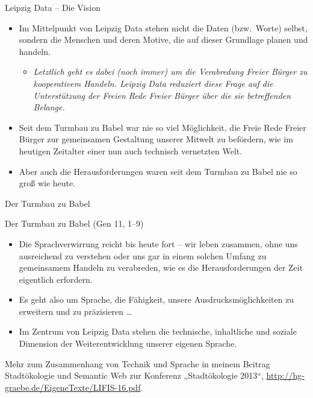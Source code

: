 \documentclass{beamer}
\begin{document}
\begin{frame}{Leipzig Data – Die Vision}{}
  \begin{itemize}
  \item Im Mittelpunkt von Leipzig Data stehen nicht die Daten (bzw.\ Worte)
    selbst, sondern die Menschen und deren Motive, die auf dieser Grundlage
    {planen} und {handeln}.
    \begin{itemize}
    \item[] \small\it Letztlich geht es dabei (noch immer) um die Verabredung
      Freier Bürger zu kooperativem Handeln. Leipzig Data reduziert diese Frage
      auf die {Unterstützung der Freien Rede Freier Bürger über die sie
        betreffenden Belange}.
    \end{itemize}
  \item Seit dem Turmbau zu Babel war nie so viel Möglichkeit, die Freie Rede
    Freier Bürger zur gemeinsamen Gestaltung unserer Mitwelt zu befördern, wie
    im heutigen Zeitalter einer nun auch technisch vernetzten Welt.
  \item Aber auch die Herausforderungen waren seit dem Turmbau zu Babel nie so
    groß wie heute.
  \end{itemize}
\end{frame}

\begin{frame}{Der Turmbau zu Babel}{}\small
  \begin{flushright}\small
    Der Turmbau zu Babel (Gen 11, 1–9)
  \end{flushright}
  \begin{itemize}
  \item Die Sprachverwirrung reicht bis heute fort – wir leben zusammen, ohne
    uns ausreichend zu verstehen oder uns gar in einem solchen Umfang zu
    gemeinsamem Handeln zu verabreden, wie es die Herausforderungen der Zeit
    eigentlich erfordern.
  \item Es geht also um Sprache, die Fähigkeit, unsere Ausdrucksmöglichkeiten
    zu erweitern und zu präzisieren {\ldots}
  \item Im Zentrum von Leipzig Data stehen die technische, inhaltliche und
    soziale Dimension der Weiterentwicklung unserer eigenen Sprache.
  \end{itemize}
  Mehr zum Zusammenhang von Technik und Sprache in meinem Beitrag
  {Stadtökologie und Semantic Web} zur Konferenz „Stadtökologie 2013“,
  \url{http://hg-graebe.de/EigeneTexte/LIFIS-16.pdf}.
\end{frame}
\end{document}
